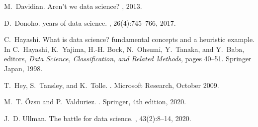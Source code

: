 \documentclass[11pt]{article}
\begin{document}
\begin{thebibliography}{1}

M.~Davidian.
\newblock Aren't we data science?
, 2013.

D.~Donoho.
 years of data science.
, 26(4):745--766,
  2017.

C.~Hayashi.
\newblock What is data science? fundamental concepts and a heuristic example.
\newblock In C.~Hayashi, K.~Yajima, H.-H. Bock, N.~Ohsumi, Y.~Tanaka, and
  Y.~Baba, editors, {\em Data Science, Classification, and Related Methods},
  pages 40--51. Springer Japan, 1998.

T.~Hey, S.~Tansley, and K.~Tolle.
.
\newblock Microsoft Research, October 2009.

M.~T. {\"O}zsu and P.~Valduriez.
.
\newblock Springer, 4th edition, 2020.

J.~D. Ullman.
\newblock The battle for data science.
, 43(2):8--14, 2020.

\end{thebibliography}
\end{document}
